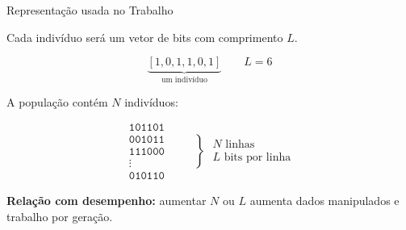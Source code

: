 \documentclass[aspectratio=169,11pt]{beamer}
\newcommand{\bits}[1]{\texttt{#1}}
\begin{document}
\begin{frame}{Representação usada no Trabalho}

    \vspace{0.05cm}

    Cada indivíduo será um vetor de bits com comprimento $L$.

    \vspace{0.18cm}

    \[
        \underbrace{[1,0,1,1,0,1]}_{\text{um indivíduo}}
        \qquad L=6
    \]

    \vspace{0.15cm}

    A população contém $N$ indivíduos:

    \vspace{0.05cm}

    \[
        \begin{array}{c}
        \bits{101101} \\
        \bits{001011} \\
        \bits{111000} \\
        \vdots \\
        \bits{010110}
        \end{array}
        \qquad
        \left\}
        \begin{array}{l}
        N \text{ linhas} \\
        L \text{ bits por linha}
        \end{array}
        \right.
    \]

    \vspace{0.08cm}

    \textbf{Relação com desempenho:}
    aumentar $N$ ou $L$ aumenta dados manipulados e trabalho por geração.

\end{frame}

\end{document}
